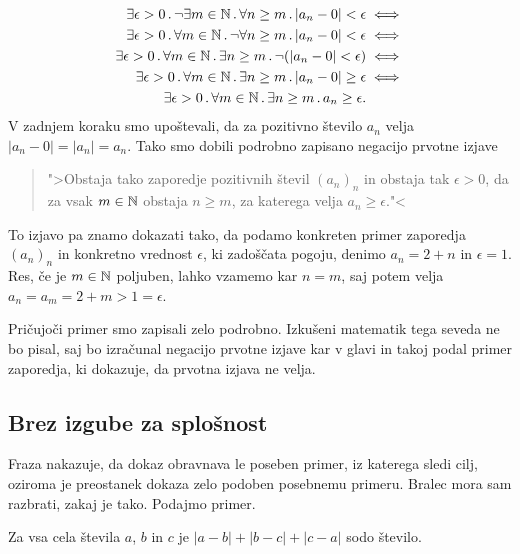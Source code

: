 \begin{zgled}
\begin{align*}
    \exists \epsilon > 0 \,.\, \lnot \exists m \in \mathbb{N} \,.\, \forall n \geq m \,.\,
          |a_n - 0| < \epsilon &\iff
    \\
    \exists \epsilon > 0 \,.\, \forall m \in \mathbb{N} \,.\, \lnot \forall n \geq m \,.\,
          |a_n - 0| < \epsilon &\iff
    \\
    \exists \epsilon > 0 \,.\, \forall m \in \mathbb{N} \,.\, \exists n \geq m \,.\,
          \lnot (|a_n - 0| < \epsilon) &\iff
    \\
    \exists \epsilon > 0 \,.\, \forall m \in \mathbb{N} \,.\, \exists n \geq m \,.\,
          |a_n - 0| \geq \epsilon &\iff
    \\
    \exists \epsilon > 0 \,.\, \forall m \in \mathbb{N} \,.\, \exists n \geq m \,.\,
          a_n \geq \epsilon.
  \end{align*}
  V zadnjem koraku smo upoštevali, da za pozitivno število $a_n$ velja
  $|a_n - 0| = |a_n| = a_n$. Tako smo dobili podrobno zapisano
  negacijo prvotne izjave
  \begin{quote}
    ">Obstaja tako zaporedje pozitivnih števil $(a_n)_n$ in obstaja
    tak $\epsilon > 0$, da za vsak $m \in \mathbb{N}$ obstaja $n \geq m$, za
    katerega velja $a_n \geq \epsilon$."<
  \end{quote}
  To izjavo pa znamo dokazati tako, da podamo konkreten primer
  zaporedja $(a_n)_n$ in konkretno vrednost $\epsilon$, ki zadoščata
  pogoju, denimo $a_n = 2 + n$ in $\epsilon = 1$. Res, če je $m \in
  \mathbb{N}$ poljuben, lahko vzamemo kar $n = m$, saj potem velja $a_n = a_m
  = 2 + m > 1 = \epsilon$.

  Pričujoči primer smo zapisali zelo podrobno. Izkušeni matematik tega
  seveda ne bo pisal, saj bo izračunal negacijo prvotne izjave kar v
  glavi in takoj podal primer zaporedja, ki dokazuje, da prvotna
  izjava ne velja.
\end{zgled}


\subsection{Brez izgube za splošnost}

Fraza  nakazuje, da dokaz obravnava le poseben primer, iz katerega sledi cilj, oziroma je preostanek dokaza zelo podoben posebnemu primeru. Bralec mora sam razbrati, zakaj je tako.
Podajmo primer.

\begin{trditev}
  \label{izrek:abc-vsota-razlik-soda}
  Za vsa cela števila $a$, $b$ in $c$ je $|a-b|+|b-c|+|c-a|$ sodo število.
\end{trditev}

